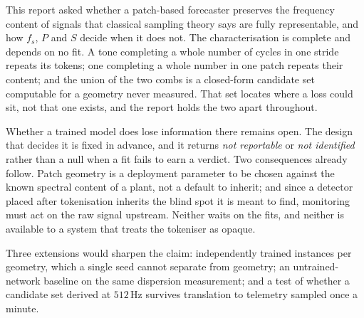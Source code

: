 This report asked whether a patch-based forecaster preserves the frequency content of signals that classical sampling theory says are fully representable, and how $f_s$, $P$ and $S$ decide when it does not. The characterisation is complete and depends on no fit. A tone completing a whole number of cycles in one stride repeats its tokens; one completing a whole number in one patch repeats their content; and the union of the two combs is a closed-form candidate set computable for a geometry never measured. That set locates where a loss could sit, not that one exists, and the report holds the two apart throughout.

Whether a trained model does lose information there remains open. The design that decides it is fixed in advance, and it returns \emph{not reportable} or \emph{not identified} rather than a null when a fit fails to earn a verdict. Two consequences already follow. Patch geometry is a deployment parameter to be chosen against the known spectral content of a plant, not a default to inherit; and since a detector placed after tokenisation inherits the blind spot it is meant to find, monitoring must act on the raw signal upstream. Neither waits on the fits, and neither is available to a system that treats the tokeniser as opaque.

Three extensions would sharpen the claim: independently trained instances per geometry, which a single seed cannot separate from geometry; an untrained-network baseline on the same dispersion measurement; and a test of whether a candidate set derived at $512$\,Hz survives translation to telemetry sampled once a minute.
